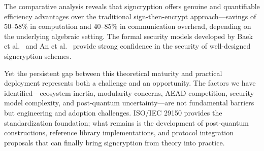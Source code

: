 \documentclass[conference]{IEEEtran}
\begin{document}
The comparative analysis reveals that signcryption offers genuine and quantifiable efficiency advantages over the traditional sign-then-encrypt approach---savings of 50--58\% in computation and 40--85\% in communication overhead, depending on the underlying algebraic setting. The formal security models developed by Baek et al.~\cite{baek2002,baek2007} and An et al.~\cite{an2002} provide strong confidence in the security of well-designed signcryption schemes.

Yet the persistent gap between this theoretical maturity and practical deployment represents both a challenge and an opportunity. The factors we have identified---ecosystem inertia, modularity concerns, AEAD competition, security model complexity, and post-quantum uncertainty---are not fundamental barriers but engineering and adoption challenges. ISO/IEC 29150 provides the standardization foundation; what remains is the development of post-quantum constructions, reference library implementations, and protocol integration proposals that can finally bring signcryption from theory into practice.
\end{document}
